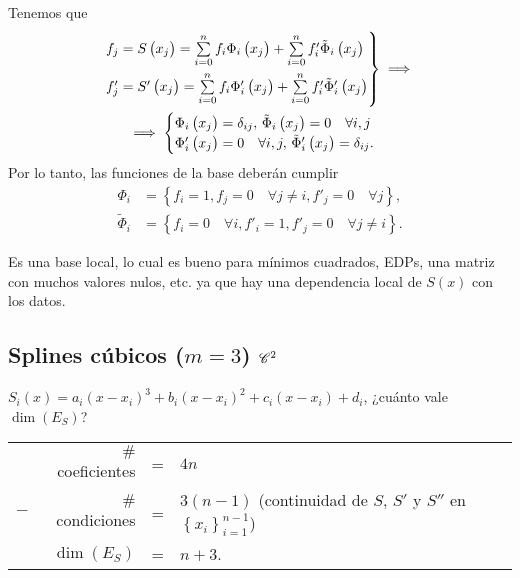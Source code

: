 Tenemos que
\begin{gather*}
    \begin{rcases}
        f_j = S\left( x_j \right) = \sum\limits_{i=0}^n f_i\Phi_i\left( x_j \right) + \sum\limits_{i=0}^n f'_i\tilde{\Phi}_i\left( x_j \right) \\
        f'_j = S'\left( x_j \right) = \sum\limits_{i=0}^n f_i\Phi'_i\left( x_j \right) + \sum\limits_{i=0}^n f'_i\tilde{\Phi}'_i\left( x_j \right)
    \end{rcases}
    \implies \\
    \implies
    \begin{cases}
        \Phi_i \left( x_j \right) = \delta_{ij},\, \tilde{\Phi}_i\left( x_j \right) = 0\quad \forall i,j\\
        \Phi_i '\left( x_j \right) = 0\quad \forall i,j,\, \tilde{\Phi}'_i\left( x_j \right) = \delta_{ij}.
    \end{cases}
\end{gather*}
Por lo tanto, las funciones de la base deberán cumplir
\begin{align*}
    \Phi_i &= \left\{ f_i = 1, f_j=0\quad \forall j\neq i, f'_j = 0 \quad\forall j \right\}, \\
    \tilde{\Phi}_i &= \left\{ f_i = 0\quad \forall i, f'_i = 1, f'_j = 0 \quad\forall j\neq i \right\}.
\end{align*}

\begin{obs}
    Es una base local, lo cual es bueno para mínimos cuadrados, EDPs, una matriz con muchos valores nulos, etc. ya que hay una dependencia local de $S\left( x \right)$ con los datos.
\end{obs}

\subsection{Splines cúbicos ($m=3$) $\mathscr{C}^2$}

$S_i\left( x \right) = a_i\left( x-x_i \right)^3 + b_i\left( x-x_i \right)^2 + c_i\left( x-x_i \right) + d_i$, ¿cuánto vale $\dim\left( E_S \right)$?

\begin{center}
    \begin{tabular}{crcl}
        & $\#$coeficientes &=& $4n$\\
        $-$ & $\#$condiciones &=& $3\left( n-1\right)$ (continuidad de $S$, $S'$ y $S''$ en $\left\{ x_i \right\}_{i=1}^{n-1}$)\\\hline
        &$\dim\left( E_S \right)$ &=& $n+3$.
    \end{tabular}
\end{center}

